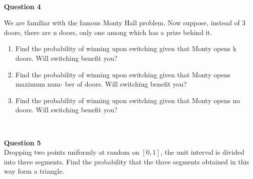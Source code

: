 \documentclass[addpoints]{exam}
\begin{document}
\begin{questions}
\begin{solution}\\
 
\end{solution}

\question \textbf{ Question 4}

We are familiar with the famous Monty Hall problem. Now suppose, instead of 3 doors, there
are n doors, only one among which has a prize behind it.
\begin{enumerate}[label=(\alph*)]
  \item Find the probability of winning upon switching given that Monty opens k doors. Will
switching benefit you?
 \item Find the probability of winning upon switching given that Monty opens maximum num-
ber of doors. Will switching benefit you?
    \item  Find the probability of winning upon switching given that Monty opens no doors. Will
switching benefit you?
\end{enumerate}
\begin{solution}\\
 
\end{solution}
\question \textbf{ Question 5}\\
Dropping two points uniformly at random on \([0, 1]\), the unit interval is divided into three segments.
Find the probability that the three segments obtained in this way form a triangle.
\begin{solution}\\
 
\end{solution}
\end{questions}
\end{document}
